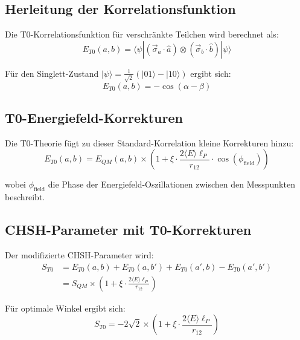 \documentclass[12pt,a4paper]{article}
\begin{document}
	\begin{technical}
		\subsection{Herleitung der Korrelationsfunktion}
		
		Die T0-Korrelationsfunktion f\"ur verschr\"ankte Teilchen wird berechnet als:
		\begin{equation}
			E_{T0}(a,b) = \langle \psi | (\vec{\sigma}_a \cdot \hat{a}) \otimes (\vec{\sigma}_b \cdot \hat{b}) | \psi \rangle
		\end{equation}
		
		F\"ur den Singlett-Zustand $|\psi\rangle = \frac{1}{\sqrt{2}}(|01\rangle - |10\rangle)$ ergibt sich:
		\begin{equation}
			E_{T0}(a,b) = -\cos(\alpha - \beta)
		\end{equation}
		
		\subsection{T0-Energiefeld-Korrekturen}
		
		Die T0-Theorie f\"ugt zu dieser Standard-Korrelation kleine Korrekturen hinzu:
		\begin{equation}
			E_{T0}(a,b) = E_{QM}(a,b) \times \left(1 + \xi \cdot \frac{2\langle E \rangle \ell_P}{r_{12}} \cdot \cos(\phi_{\text{field}})\right)
		\end{equation}
		
		wobei $\phi_{\text{field}}$ die Phase der Energiefeld-Oszillationen zwischen den Messpunkten beschreibt.
		
		\subsection{CHSH-Parameter mit T0-Korrekturen}
		
		Der modifizierte CHSH-Parameter wird:
		\begin{align}
			S_{T0} &= E_{T0}(a,b) + E_{T0}(a,b') + E_{T0}(a',b) - E_{T0}(a',b') \\
			&= S_{QM} \times \left(1 + \xi \cdot \frac{2\langle E \rangle \ell_P}{r_{12}}\right)
		\end{align}
		
		F\"ur optimale Winkel ergibt sich:
		\begin{equation}
			S_{T0} = -2\sqrt{2} \times \left(1 + \xi \cdot \frac{2\langle E \rangle \ell_P}{r_{12}}\right)
		\end{equation}
		

\end{technical}
\end{document}

